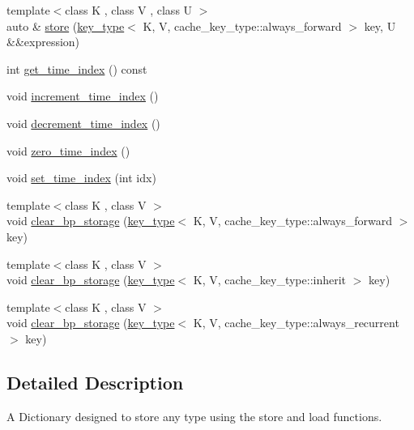 \begin{DoxyCompactItemize}
{\footnotesize template$<$class K , class V , class U $>$ }\\auto \& \hyperlink{structbc_1_1nn_1_1Cache_af86f0bbe8821b5671b2ffa34ab9443d9}{store} (\hyperlink{structbc_1_1nn_1_1Cache_aedd77c5710dcb5f9edd8ecb3c3041048}{key\+\_\+type}$<$ K, V, cache\+\_\+key\+\_\+type\+::always\+\_\+forward $>$ key, U \&\&expression)
\item 
int \hyperlink{structbc_1_1nn_1_1Cache_a39b3c45a4c4f14c02c190957329bd6dc}{get\+\_\+time\+\_\+index} () const
\item 
void \hyperlink{structbc_1_1nn_1_1Cache_ae2fcde96a0ef66f8c3aa31e6f3125804}{increment\+\_\+time\+\_\+index} ()
\item 
void \hyperlink{structbc_1_1nn_1_1Cache_ae67689af283aadf9ccc5f05a68959bbe}{decrement\+\_\+time\+\_\+index} ()
\item 
void \hyperlink{structbc_1_1nn_1_1Cache_ad2ffef3741713197af3149c0f4356572}{zero\+\_\+time\+\_\+index} ()
\item 
void \hyperlink{structbc_1_1nn_1_1Cache_a696ba8a7e1c35c243d37cce7e87aed58}{set\+\_\+time\+\_\+index} (int idx)
\item 
{\footnotesize template$<$class K , class V $>$ }\\void \hyperlink{structbc_1_1nn_1_1Cache_a94b464a2aadc62eacc8e3c38898d6f41}{clear\+\_\+bp\+\_\+storage} (\hyperlink{structbc_1_1nn_1_1Cache_aedd77c5710dcb5f9edd8ecb3c3041048}{key\+\_\+type}$<$ K, V, cache\+\_\+key\+\_\+type\+::always\+\_\+forward $>$ key)
\item 
{\footnotesize template$<$class K , class V $>$ }\\void \hyperlink{structbc_1_1nn_1_1Cache_a254786e78b5e6b65f98d9c76a8038431}{clear\+\_\+bp\+\_\+storage} (\hyperlink{structbc_1_1nn_1_1Cache_aedd77c5710dcb5f9edd8ecb3c3041048}{key\+\_\+type}$<$ K, V, cache\+\_\+key\+\_\+type\+::inherit $>$ key)
\item 
{\footnotesize template$<$class K , class V $>$ }\\void \hyperlink{structbc_1_1nn_1_1Cache_a8717570a6da7f67b192894f44ffb5c32}{clear\+\_\+bp\+\_\+storage} (\hyperlink{structbc_1_1nn_1_1Cache_aedd77c5710dcb5f9edd8ecb3c3041048}{key\+\_\+type}$<$ K, V, cache\+\_\+key\+\_\+type\+::always\+\_\+recurrent $>$ key)
\end{DoxyCompactItemize}


\subsection{Detailed Description}
A Dictionary designed to store any type using the \textquotesingle{}store\textquotesingle{} and \textquotesingle{}load\textquotesingle{} functions. 

